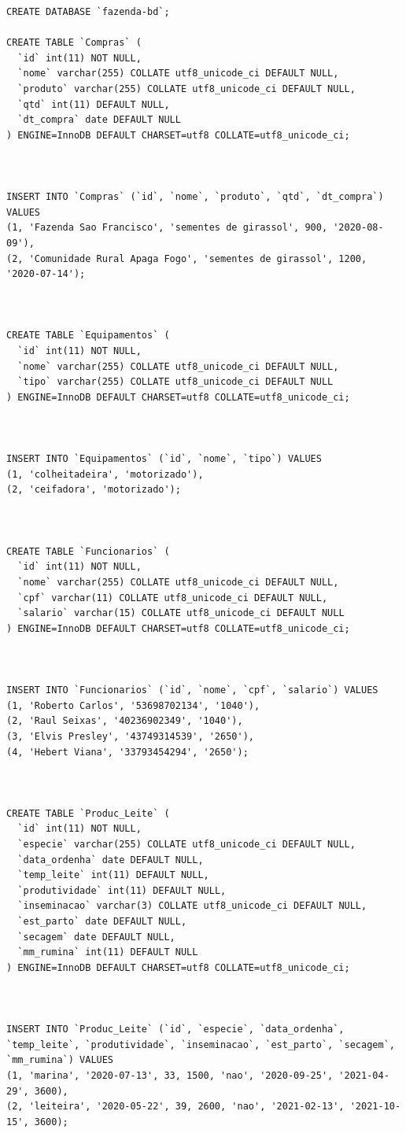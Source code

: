 \begin{verbatim}
CREATE DATABASE `fazenda-bd`;

CREATE TABLE `Compras` (
  `id` int(11) NOT NULL,
  `nome` varchar(255) COLLATE utf8_unicode_ci DEFAULT NULL,
  `produto` varchar(255) COLLATE utf8_unicode_ci DEFAULT NULL,
  `qtd` int(11) DEFAULT NULL,
  `dt_compra` date DEFAULT NULL
) ENGINE=InnoDB DEFAULT CHARSET=utf8 COLLATE=utf8_unicode_ci;



INSERT INTO `Compras` (`id`, `nome`, `produto`, `qtd`, `dt_compra`) VALUES
(1, 'Fazenda Sao Francisco', 'sementes de girassol', 900, '2020-08-09'),
(2, 'Comunidade Rural Apaga Fogo', 'sementes de girassol', 1200, '2020-07-14');



CREATE TABLE `Equipamentos` (
  `id` int(11) NOT NULL,
  `nome` varchar(255) COLLATE utf8_unicode_ci DEFAULT NULL,
  `tipo` varchar(255) COLLATE utf8_unicode_ci DEFAULT NULL
) ENGINE=InnoDB DEFAULT CHARSET=utf8 COLLATE=utf8_unicode_ci;



INSERT INTO `Equipamentos` (`id`, `nome`, `tipo`) VALUES
(1, 'colheitadeira', 'motorizado'),
(2, 'ceifadora', 'motorizado');



CREATE TABLE `Funcionarios` (
  `id` int(11) NOT NULL,
  `nome` varchar(255) COLLATE utf8_unicode_ci DEFAULT NULL,
  `cpf` varchar(11) COLLATE utf8_unicode_ci DEFAULT NULL,
  `salario` varchar(15) COLLATE utf8_unicode_ci DEFAULT NULL
) ENGINE=InnoDB DEFAULT CHARSET=utf8 COLLATE=utf8_unicode_ci;



INSERT INTO `Funcionarios` (`id`, `nome`, `cpf`, `salario`) VALUES
(1, 'Roberto Carlos', '53698702134', '1040'),
(2, 'Raul Seixas', '40236902349', '1040'),
(3, 'Elvis Presley', '43749314539', '2650'),
(4, 'Hebert Viana', '33793454294', '2650');



CREATE TABLE `Produc_Leite` (
  `id` int(11) NOT NULL,
  `especie` varchar(255) COLLATE utf8_unicode_ci DEFAULT NULL,
  `data_ordenha` date DEFAULT NULL,
  `temp_leite` int(11) DEFAULT NULL,
  `produtividade` int(11) DEFAULT NULL,
  `inseminacao` varchar(3) COLLATE utf8_unicode_ci DEFAULT NULL,
  `est_parto` date DEFAULT NULL,
  `secagem` date DEFAULT NULL,
  `mm_rumina` int(11) DEFAULT NULL
) ENGINE=InnoDB DEFAULT CHARSET=utf8 COLLATE=utf8_unicode_ci;



INSERT INTO `Produc_Leite` (`id`, `especie`, `data_ordenha`, `temp_leite`, `produtividade`, `inseminacao`, `est_parto`, `secagem`, `mm_rumina`) VALUES
(1, 'marina', '2020-07-13', 33, 1500, 'nao', '2020-09-25', '2021-04-29', 3600),
(2, 'leiteira', '2020-05-22', 39, 2600, 'nao', '2021-02-13', '2021-10-15', 3600);




\end{verbatim}
